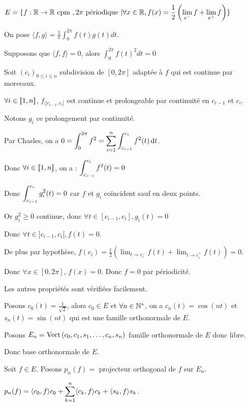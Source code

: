 \begin{exemple}
    $\displaystyle E = \{ f : \mathbb{R} \to \mathbb{R} \text{ cpm }, 2 \pi \text{ périodique } | \forall x \in \mathbb{R}, f(x) = \frac 1 2 \left( \lim_{x^-} f + \lim_{x^+} f \right) \}$

    On pose $\langle f, g \rangle = \frac{1}{\pi} \int_0^{2\pi} f(t) g(t) dt$.

    Supposons que $\langle f, f \rangle = 0$, alors $\int_{0}^{2 \pi} f(t)^2 dt = 0$ 

    Soit $(c_i)_{0 \leqslant i \leqslant n}$ subdivision de $[0, 2\pi]$ adaptée à $f$ qui est continue par morceaux. 

    $\forall i \in [\![1, n]\!]$, $f_{|]c_{i - 1}, c_i[} $ est continue et prolongeable par continuité en 
    $c_{i - 1}$ et $c_i$.

    Notons $g_i$ ce prolongement par continuité. 

    Par Chasles, on a $0 = \displaystyle \int_{0}^{2 \pi} f^2 = \sum_{i = 1 }^{n } \int_{c_{i - 1}}^{c_i }f^2(t) \,\mathrm{d}t$.

    Donc $\forall i \in [\![1, n]\!]$, on a : $\displaystyle \int_{c_{i - 1}}^{c_i } f^2 (t) \displaystyle = 0$

    Donc $\displaystyle \int_{c_{i - 1}}^{c_i } g_i^2 (t) \displaystyle = 0$ car $f$ et $g_i$ coïncident sauf en deux points. 

    Or $g_i^2 \geqslant 0$ continue, donc $\forall t \in [c_{i - 1}, c_i], g_i(t) = 0$ 

    Donc $\forall t \in ]c_{i - 1}, c_i[, f(t) = 0$.

    De plus par hypothèse, $f(c_i) = \frac 1 2 \left( \lim_{t \to c_i^-} f(t) + \lim_{t \to c_i^+} f(t) \right) = 0$.

    Donc $\forall x \in [0, 2 \pi]$, $f(x) = 0$. Donc $f = 0$ par périodicité. 

    Les autres propriétés sont vérifiées facilement.

    Posons $c_0(t) = \frac 1 {\sqrt 2}$, alors $c_0 \in E$ 
    et $\forall n \in \mathbb{N}^*$, on a $c_n(t) = \cos(nt)$ et $s_n(t) = \sin(nt)$ qui est une famille orthonormale de $E$.

    Posons $E_n = \operatorname{Vect} \,(c_0, c_1, s_1, \dots, c_n, s_n)$ famille orthonormale de $E$ donc libre. 

    Donc base orthonormale de $E$.

    Soit $f \in E$. Posons $p_n(f) = $ projecteur orthogonal de $f$ sur $E_n$.

    $p_n(f) = \langle c_0, f \rangle c_0 + \displaystyle \sum_{k = 1}^n \langle c_k, f \rangle c_k + \langle s_k, f \rangle s_k$.


\end{exemple}
